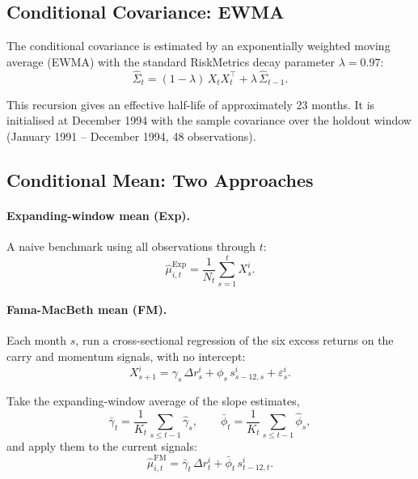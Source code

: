 \documentclass[a4paper,12pt]{article}
\begin{document}
\subsection{Conditional Covariance: EWMA}

The conditional covariance is estimated by an exponentially weighted moving average
(EWMA) with the standard RiskMetrics decay parameter $\lambda = 0.97$:
\begin{equation}
    \hat{\Sigma}_t = (1 - \lambda) \, X_t X_t^{\top} + \lambda \, \hat{\Sigma}_{t-1}.
\end{equation}

This recursion gives an effective half-life of approximately 23 months. It is initialised
at December 1994 with the sample covariance over the holdout window
(January 1991 -- December 1994, 48 observations).

\subsection{Conditional Mean: Two Approaches}

\paragraph{Expanding-window mean (Exp).}
A naive benchmark using all observations through $t$:
\begin{equation}
    \hat{\mu}^{\text{Exp}}_{i,t} = \frac{1}{N_t} \sum_{s=1}^{t} X^i_s.
\end{equation}

\paragraph{Fama-MacBeth mean (FM).}
Each month $s$, run a cross-sectional regression of the six excess returns on the carry
and momentum signals, with no intercept:
\begin{equation}
    X^i_{s+1} = \gamma_s \, \Delta r^i_s + \phi_s \, s^i_{s-12,s} + \varepsilon^i_s.
\end{equation}

Take the expanding-window average of the slope estimates,
\[
    \bar{\gamma}_t = \frac{1}{K_t} \sum_{s \le t-1} \hat{\gamma}_s,
    \qquad
    \bar{\phi}_t = \frac{1}{K_t} \sum_{s \le t-1} \hat{\phi}_s,
\]
and apply them to the current signals:
\begin{equation}
    \hat{\mu}^{\text{FM}}_{i,t} = \bar{\gamma}_t \, \Delta r^i_t + \bar{\phi}_t \, s^i_{t-12,t}.
\end{equation}
\end{document}
